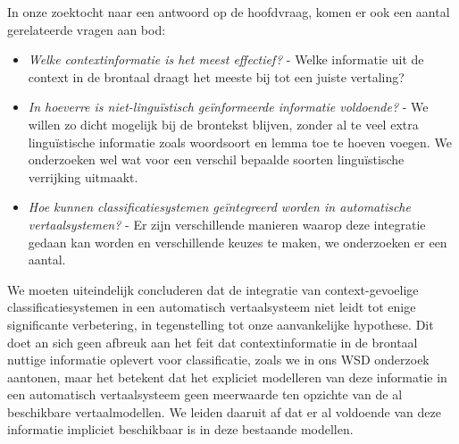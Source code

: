 In onze zoektocht naar een antwoord op de hoofdvraag, komen er ook een aantal gerelateerde vragen aan bod:

\begin{itemize}
\item \emph{Welke contextinformatie is het meest effectief?} - Welke informatie uit de context in de brontaal draagt het
    meeste bij tot een juiste vertaling?
\item \emph{In hoeverre is niet-linguïstisch geïnformeerde informatie voldoende?} - We willen zo dicht mogelijk bij de
    brontekst blijven, zonder al te veel extra linguïstische informatie zoals woordsoort en lemma toe te
    hoeven voegen. We onderzoeken wel wat voor een verschil bepaalde soorten linguïstische verrijking uitmaakt.
\item \emph{Hoe kunnen classificatiesystemen geïntegreerd worden in automatische vertaalsystemen?} - Er zijn
    verschillende manieren waarop deze integratie gedaan kan worden en verschillende keuzes te maken, we onderzoeken er een aantal.
\end{itemize}

We moeten uiteindelijk concluderen dat de integratie van context-gevoelige classificatiesystemen in een automatisch
vertaalsysteem niet leidt tot enige significante verbetering, in tegenstelling tot onze aanvankelijke hypothese. Dit
doet an sich geen afbreuk aan het feit dat contextinformatie in de brontaal nuttige informatie oplevert voor
classificatie, zoals we in ons WSD onderzoek aantonen, maar het betekent dat het expliciet modelleren van deze
informatie in een automatisch vertaalsysteem geen meerwaarde ten opzichte van de al beschikbare vertaalmodellen. We
leiden daaruit af dat er al voldoende van deze informatie impliciet beschikbaar is in deze bestaande modellen.


